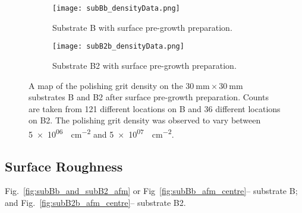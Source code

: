 \begin{figure}[htbp]
    \centering
    \begin{subfigure}[t]{0.8\textwidth}
        \centering
        \texttt{[image: subBb\_densityData.png]}
        \caption{Substrate B with surface pre-growth preparation.}\label{fig:subBb_densityData}
    \end{subfigure}
    \par\bigskip
    \begin{subfigure}[t]{0.8\textwidth}
        \centering
        \texttt{[image: subB2b\_densityData.png]}
        \caption{Substrate B2 with surface pre-growth preparation.}\label{fig:subB2b_densityData}
    \end{subfigure}
    \caption[Map of the polishing grit density on substrate B and B2 after surface pre-growth preparation.]{A map of the polishing grit density on the $\SI{30}{\milli\metre}\times\SI{30}{\milli\metre}$ substrates B and B2 after surface pre-growth preparation. Counts are taken from 121 different locations on B and 36 different locations on B2. The polishing grit density was observed to vary between \SI{5e+06}{\particle\centi\metre^{-2}} and \SI{5e+07}{\particle\centi\metre^{-2}}.}
    \label{fig:subBb_and_subB2b_densityData}
\end{figure}


\subsection{Surface Roughness}
Fig.~\ref{fig:subBb_and_subB2_afm} or Fig~\ref{fig:subBb_afm_centre}-- substrate B; and Fig.~\ref{fig:subB2b_afm_centre}-- substrate B2.

